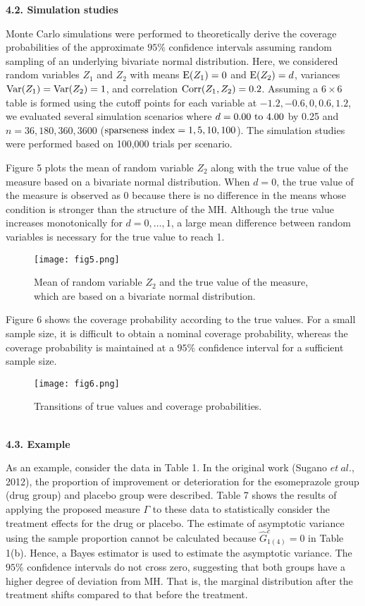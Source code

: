 \documentclass[a4j,12pt]{article}
\begin{document}
\newpage
\noindent \textbf{\large 4.2. Simulation studies}

Monte Carlo simulations were performed to theoretically derive the coverage probabilities of the approximate $95\%$ confidence intervals assuming random sampling of an underlying bivariate normal distribution. 
Here, we considered random variables $Z_1$ and $Z_2$ with means ${\rm E}(Z_1) = 0$ and ${\rm E}(Z_2) = d$, variances ${\rm Var}(Z_1) = {\rm Var}(Z_2) = 1$, and correlation ${\rm Corr}(Z_1, Z_2 ) = 0.2$. 
Assuming a $6 \times 6$ table is formed using the cutoff points for each variable at $-1.2, -0.6, 0, 0.6, 1.2$, we evaluated several simulation scenarios where $d = 0.00~{\rm to}~4.00$ by 0.25 and $n = 36, 180, 360, 3600$ (${\rm sparseness~index}=1, 5, 10, 100$). 
The simulation studies were performed based on 100,000 trials per scenario.

Figure 5 plots the mean of random variable $Z_2$ along with the true value of the measure based on a bivariate normal distribution. 
When $d=0$, the true value of the measure is observed as 0 because there is no difference in the means whose condition is stronger than the structure of the MH.
Although the true value increases monotonically for $d=0, \ldots, 1$, a large mean difference between random variables is necessary for the true value to reach 1.
\begin{figure}[h]
\centering
\texttt{[image: fig5.png]}
\caption{Mean of random variable $Z_2$ and the true value of the measure, which are based on a bivariate normal distribution.}
\end{figure}

Figure 6 shows the coverage probability according to the true values. 
For a small sample size, it is difficult to obtain a nominal coverage probability, whereas the coverage probability is maintained at a $95\%$ confidence interval for a sufficient sample size.
\begin{figure}[h]
\centering
\texttt{[image: fig6.png]}
\caption{Transitions of true values and coverage probabilities.}
\end{figure}
\\

\newpage
\noindent \textbf{\large 4.3. Example}

As an example, consider the data in Table 1. 
In the original work (Sugano $et~al$., 2012), the proportion of improvement or deterioration for the esomeprazole group (drug group) and placebo group were described. 
Table 7 shows the results of applying the proposed measure $\Gamma$ to these data to statistically consider the treatment effects for the drug or placebo. 
The estimate of asymptotic variance using the sample proportion cannot be calculated because $\hat{G}^c_{1(4)}=0$ in Table 1(b). 
Hence, a Bayes estimator is used to estimate the asymptotic variance. 
The $95\%$ confidence intervals do not cross zero, suggesting that both groups have a higher degree of deviation from MH. 
That is, the marginal distribution after the treatment shifts compared to that before the treatment.
\end{document}

